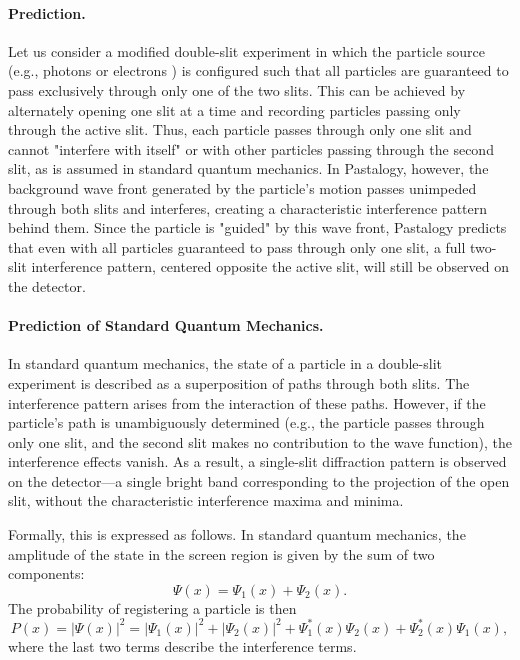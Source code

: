 \documentclass[pdflatex,sn-mathphys-num,referee]{sn-jnl}
\begin{document}
\paragraph{Prediction.} Let us consider a modified double-slit experiment in which the particle source (e.g., photons or electrons \cite{tonomura1989-electron}) is configured such that all particles are guaranteed to pass exclusively through only one of the two slits. This can be achieved by alternately opening one slit at a time and recording particles passing only through the active slit. Thus, each particle passes through only one slit and cannot "interfere with itself" or with other particles passing through the second slit, as is assumed in standard quantum mechanics. In Pastalogy, however, the background wave front generated by the particle's motion passes unimpeded through both slits and interferes, creating a characteristic interference pattern behind them. Since the particle is "guided" by this wave front, Pastalogy predicts that even with all particles guaranteed to pass through only one slit, a full two-slit interference pattern, centered opposite the active slit, will still be observed on the detector.

\paragraph{Prediction of Standard Quantum Mechanics.} In standard quantum mechanics, the state of a particle in a double-slit experiment is described as a superposition of paths through both slits. The interference pattern arises from the interaction of these paths. However, if the particle's path is unambiguously determined (e.g., the particle passes through only one slit, and the second slit makes no contribution to the wave function), the interference effects vanish. As a result, a single-slit diffraction pattern is observed on the detector---a single bright band corresponding to the projection of the open slit, without the characteristic interference maxima and minima.

Formally, this is expressed as follows. In standard quantum mechanics, the amplitude of the state in the screen region is given by the sum of two components:
\begin{equation}
    \Psi(x) = \Psi_1(x) + \Psi_2(x).
\end{equation}
The probability of registering a particle is then
\begin{equation}
    P(x) = |\Psi(x)|^2 = |\Psi_1(x)|^2 + |\Psi_2(x)|^2 + \Psi_1^*(x)\Psi_2(x) + \Psi_2^*(x)\Psi_1(x),
\end{equation}
where the last two terms describe the interference terms.
\end{document}
